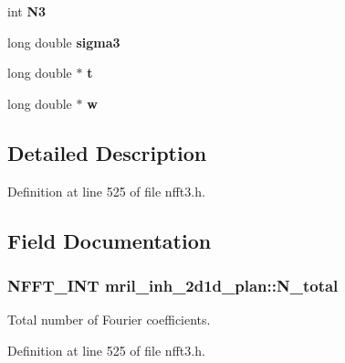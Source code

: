 \begin{DoxyCompactItemize}
\item 
\hypertarget{structmril__inh__2d1d__plan_ab27fdcb536441767bf95adb8cbfe6425}{int {\bfseries N3}}\label{structmril__inh__2d1d__plan_ab27fdcb536441767bf95adb8cbfe6425}

\item 
\hypertarget{structmril__inh__2d1d__plan_a71b071b164272b44056ef3b8db619eaf}{long double {\bfseries sigma3}}\label{structmril__inh__2d1d__plan_a71b071b164272b44056ef3b8db619eaf}

\item 
\hypertarget{structmril__inh__2d1d__plan_af38eb9a2453ec19d56017f6eda837e3f}{long double $\ast$ {\bfseries t}}\label{structmril__inh__2d1d__plan_af38eb9a2453ec19d56017f6eda837e3f}

\item 
\hypertarget{structmril__inh__2d1d__plan_abca46d1b594697ace053934faacf1639}{long double $\ast$ {\bfseries w}}\label{structmril__inh__2d1d__plan_abca46d1b594697ace053934faacf1639}

\end{DoxyCompactItemize}


\subsection{Detailed Description}


Definition at line 525 of file nfft3.\-h.



\subsection{Field Documentation}
\hypertarget{structmril__inh__2d1d__plan_a3a23d1594bc977848d228d087f774602}{
\subsubsection[{N\-\_\-total}]{\setlength{\rightskip}{0pt plus 5cm}N\-F\-F\-T\-\_\-\-I\-N\-T mril\-\_\-inh\-\_\-2d1d\-\_\-plan\-::\-N\-\_\-total}}\label{structmril__inh__2d1d__plan_a3a23d1594bc977848d228d087f774602}


Total number of Fourier coefficients. 



Definition at line 525 of file nfft3.\-h.

